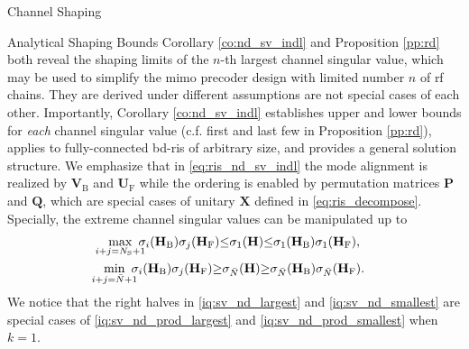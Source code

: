 \documentclass[journal]{IEEEtran}
\begin{document}
\begin{section}{Channel Shaping}
\begin{subsection}{Analytical Shaping Bounds}
		Corollary \ref{co:nd_sv_indl} and Proposition \ref{pp:rd} both reveal the shaping limits of the $n$-th largest channel singular value, which may be used to simplify the \gls{mimo} precoder design with limited number $n$ of \gls{rf} chains.
		They are derived under different assumptions are not special cases of each other.
		Importantly, Corollary \ref{co:nd_sv_indl} establishes upper and lower bounds for \emph{each} channel singular value (c.f. first and last few in Proposition \ref{pp:rd}), applies to fully-connected \gls{bd}-\gls{ris} of arbitrary size, and provides a general solution structure.
		We emphasize that in \eqref{eq:ris_nd_sv_indl} the mode alignment is realized by $\mathbf{V}_\mathrm{B}$ and $\mathbf{U}_\mathrm{F}$ while the ordering is enabled by permutation matrices $\mathbf{P}$ and $\mathbf{Q}$, which are special cases of unitary $\mathbf{X}$ defined in \eqref{eq:ris_decompose}.
		Specially, the extreme channel singular values can be manipulated up to
		\begin{subequations}
			\label{iq:sv_nd_extreme}
			\begin{gather}
				\max_{\mathclap{i+j=N_\mathrm{S}+1}} \ \sigma_i(\mathbf{H}_\mathrm{B}) \sigma_j(\mathbf{H}_\mathrm{F}) {\le} \sigma_1(\mathbf{H}) {\le} \sigma_1(\mathbf{H}_\mathrm{B}) \sigma_1(\mathbf{H}_\mathrm{F}), \label{iq:sv_nd_largest} \\
				\min_{\mathclap{i+j=\bar{N}+1}} \ \sigma_i(\mathbf{H}_\mathrm{B}) \sigma_j(\mathbf{H}_\mathrm{F}) {\ge} \sigma_{\bar{N}}(\mathbf{H}) {\ge} \sigma_{\bar{N}}(\mathbf{H}_\mathrm{B}) \sigma_{\bar{N}}(\mathbf{H}_\mathrm{F}). \label{iq:sv_nd_smallest}
			\end{gather}
		\end{subequations}
		We notice that the right halves in \eqref{iq:sv_nd_largest} and \eqref{iq:sv_nd_smallest} are special cases of \eqref{iq:sv_nd_prod_largest} and \eqref{iq:sv_nd_prod_smallest} when $k=1$.


\end{subsection}
\end{section}
\end{document}
